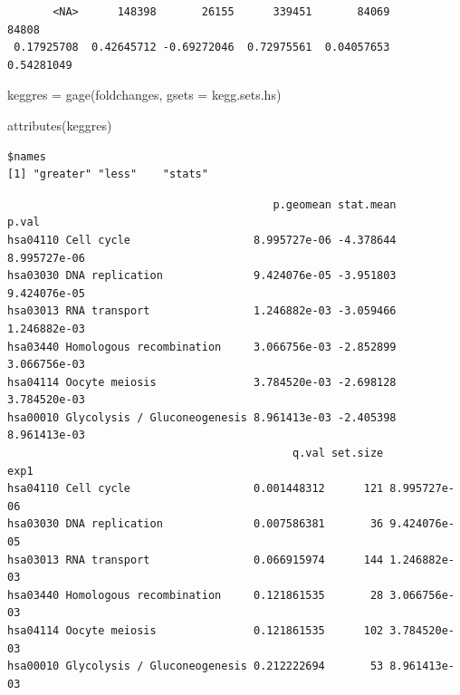 \documentclass[
  letterpaper,
  DIV=11,
  numbers=noendperiod]{scrartcl}
\newenvironment{Shaded}{\begin{snugshade}}{\end{snugshade}}
\newcommand{\AttributeTok}[1]{\textcolor[rgb]{0.40,0.45,0.13}{#1}}
\newcommand{\FunctionTok}[1]{\textcolor[rgb]{0.28,0.35,0.67}{#1}}
\newcommand{\NormalTok}[1]{\textcolor[rgb]{0.00,0.23,0.31}{#1}}
\newcommand{\OtherTok}[1]{\textcolor[rgb]{0.00,0.23,0.31}{#1}}
\newcommand{\SpecialCharTok}[1]{\textcolor[rgb]{0.37,0.37,0.37}{#1}}
\begin{document}
\begin{verbatim}
       <NA>      148398       26155      339451       84069       84808 
 0.17925708  0.42645712 -0.69272046  0.72975561  0.04057653  0.54281049 
\end{verbatim}

\begin{Shaded}
\begin{Highlighting}[]
\NormalTok{keggres }\OtherTok{=} \FunctionTok{gage}\NormalTok{(foldchanges, }\AttributeTok{gsets =}\NormalTok{ kegg.sets.hs)}
\end{Highlighting}
\end{Shaded}

\begin{Shaded}
\begin{Highlighting}[]
\FunctionTok{attributes}\NormalTok{(keggres)}
\end{Highlighting}
\end{Shaded}

\begin{verbatim}
$names
[1] "greater" "less"    "stats"  
\end{verbatim}

\begin{Shaded}
\end{Shaded}

\begin{verbatim}
                                         p.geomean stat.mean        p.val
hsa04110 Cell cycle                   8.995727e-06 -4.378644 8.995727e-06
hsa03030 DNA replication              9.424076e-05 -3.951803 9.424076e-05
hsa03013 RNA transport                1.246882e-03 -3.059466 1.246882e-03
hsa03440 Homologous recombination     3.066756e-03 -2.852899 3.066756e-03
hsa04114 Oocyte meiosis               3.784520e-03 -2.698128 3.784520e-03
hsa00010 Glycolysis / Gluconeogenesis 8.961413e-03 -2.405398 8.961413e-03
                                            q.val set.size         exp1
hsa04110 Cell cycle                   0.001448312      121 8.995727e-06
hsa03030 DNA replication              0.007586381       36 9.424076e-05
hsa03013 RNA transport                0.066915974      144 1.246882e-03
hsa03440 Homologous recombination     0.121861535       28 3.066756e-03
hsa04114 Oocyte meiosis               0.121861535      102 3.784520e-03
hsa00010 Glycolysis / Gluconeogenesis 0.212222694       53 8.961413e-03
\end{verbatim}
\end{document}
